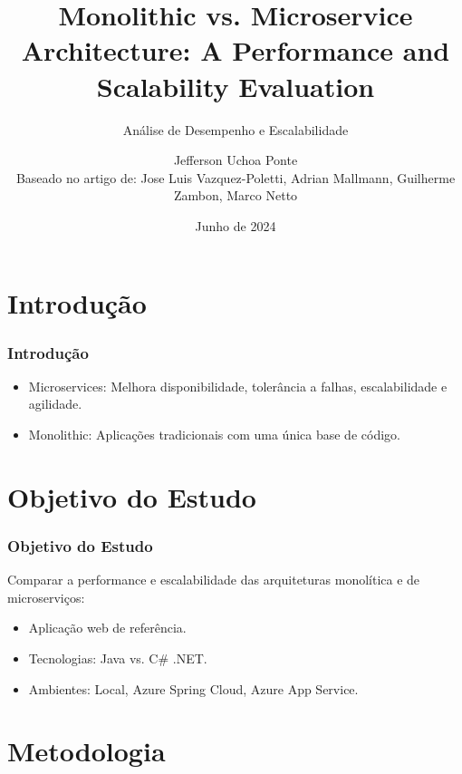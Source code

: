 \documentclass{beamer}
\title[Monolithic vs. Microservices] %
{Monolithic vs. Microservice Architecture: A Performance and Scalability Evaluation}
\subtitle{Análise de Desempenho e Escalabilidade}
\author[Jefferson Uchoa Ponte] %
{Jefferson Uchoa Ponte\\
Baseado no artigo de: Jose Luis Vazquez-Poletti, Adrian Mallmann, Guilherme Zambon, Marco Netto}
\institute[UECE] %
{
  Universidade Estadual do Ceará (UECE) \\
  Engenharia de Software \\
  Prof. Matheus Paixão
}
\date[Junho 2024] %
{Junho de 2024}
\begin{document}
\frame{\titlepage}

\section{Introdução}

\begin{frame}
\frametitle{Introdução}
\begin{itemize}
    \item Microservices: Melhora disponibilidade, tolerância a falhas, escalabilidade e agilidade.
    \item Monolithic: Aplicações tradicionais com uma única base de código.
\end{itemize}
\end{frame}

\section{Objetivo do Estudo}

\begin{frame}
\frametitle{Objetivo do Estudo}
Comparar a performance e escalabilidade das arquiteturas monolítica e de microserviços:
\begin{itemize}
    \item Aplicação web de referência.
    \item Tecnologias: Java vs. C\# .NET.
    \item Ambientes: Local, Azure Spring Cloud, Azure App Service.
\end{itemize}
\end{frame}

\section{Metodologia}
\end{document}
